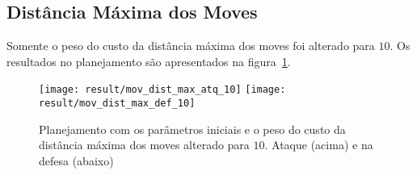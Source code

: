 \subsection{Distância Máxima dos Moves} 
Somente o peso do custo da distância máxima dos moves foi
alterado para $10$. Os resultados no planejamento são
apresentados na figura~\ref{fig:mov_dist_max_10}.

\begin{figure}[H]
  \centering
  \texttt{[image: result/mov\_dist\_max\_atq\_10]}
  \texttt{[image: result/mov\_dist\_max\_def\_10]}
  \caption{Planejamento com os parâmetros iniciais e o peso do
           custo da distância máxima dos moves alterado para $10$.
           Ataque (acima) e na defesa (abaixo)}\label{fig:mov_dist_max_10}
\end{figure}

